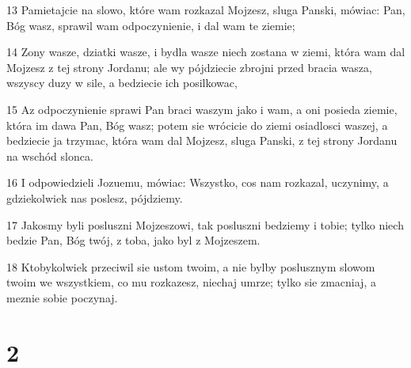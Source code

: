 \par 13 Pamietajcie na slowo, które wam rozkazal Mojzesz, sluga Panski, mówiac: Pan, Bóg wasz, sprawil wam odpoczynienie, i dal wam te ziemie;
\par 14 Zony wasze, dziatki wasze, i bydla wasze niech zostana w ziemi, która wam dal Mojzesz z tej strony Jordanu; ale wy pójdziecie zbrojni przed bracia wasza, wszyscy duzy w sile, a bedziecie ich posilkowac,
\par 15 Az odpoczynienie sprawi Pan braci waszym jako i wam, a oni posieda ziemie, która im dawa Pan, Bóg wasz; potem sie wrócicie do ziemi osiadlosci waszej, a bedziecie ja trzymac, która wam dal Mojzesz, sluga Panski, z tej strony Jordanu na wschód slonca.
\par 16 I odpowiedzieli Jozuemu, mówiac: Wszystko, cos nam rozkazal, uczynimy, a gdziekolwiek nas poslesz, pójdziemy.
\par 17 Jakosmy byli posluszni Mojzeszowi, tak posluszni bedziemy i tobie; tylko niech bedzie Pan, Bóg twój, z toba, jako byl z Mojzeszem.
\par 18 Ktobykolwiek przeciwil sie ustom twoim, a nie bylby poslusznym slowom twoim we wszystkiem, co mu rozkazesz, niechaj umrze; tylko sie zmacniaj, a meznie sobie poczynaj.

\chapter{2}

